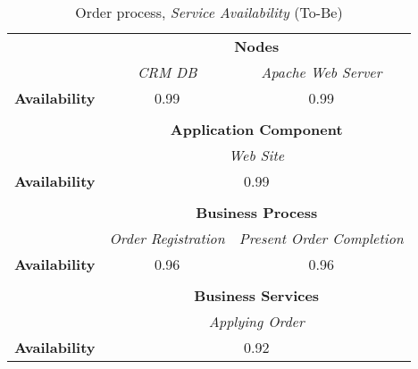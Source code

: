 \begin{table}[H]
	\centering
	\begin{tabular}{|c|c|p{2cm}|p{2.5cm}|p{2.5cm}|p{2.5cm}|}
		\cline{3-6}

		\multicolumn{2}{c}{} & \multicolumn{4}{|c|}{\textbf{Nodes}} \\ \cline{3-6}
		\multicolumn{2}{c|}{} & \multicolumn{2}{c|}{\textsl{CRM DB}} & \multicolumn{2}{c|}{\textsl{Apache Web Server}} \\
		\hline
		\multicolumn{2}{|c|}{\textbf{Availability}}  & \multicolumn{2}{c|}{0.99} & \multicolumn{2}{c|}{0.99} \\ \hline
		
		\multicolumn{6}{c}{} \\ \cline{3-6}
		\multicolumn{2}{c}{} & \multicolumn{4}{|c|}{\textbf{Application Component}} \\ \cline{3-6}
		\multicolumn{2}{c|}{} & \multicolumn{4}{c|}{\textsl{Web Site}}  \\
		\hline
		\multicolumn{2}{|c|}{\textbf{Availability}} & \multicolumn{4}{c|}{0.99}  \\ \hline
		
		\multicolumn{6}{c}{} \\ \cline{3-6}
		\multicolumn{2}{c}{} & \multicolumn{4}{|c|}{\textbf{Business Process}} \\ \cline{3-6}
		\multicolumn{2}{c|}{} & \multicolumn{2}{c|}{\textsl{Order Registration}} & \multicolumn{2}{c|}{\textsl{Present Order Completion}} \\
		\hline
		\multicolumn{2}{|c|}{\textbf{Availability}} & \multicolumn{2}{c|}{0.96} & \multicolumn{2}{c|}{0.96} \\ \hline

		\multicolumn{6}{c}{} \\ \cline{3-6}
		\multicolumn{2}{c}{} & \multicolumn{4}{|c|}{\textbf{Business Services}} \\ \cline{3-6}
		\multicolumn{2}{c|}{} &  \multicolumn{4}{c|}{\textsl{Applying Order}}  \\
		\hline
		\multicolumn{2}{|c|}{\textbf{Availability}}  & \multicolumn{4}{c|}{0.92}\\ \hline
	\end{tabular}
\caption{Order process, \textsl{Service Availability} (To-Be)} 
\label{tab:order_as_is}
\end{table}